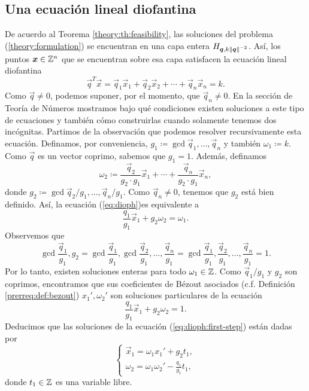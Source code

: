 \subsection{Una ecuación lineal diofantina}
\noindent
De acuerdo al Teorema \ref{theory:th:feasibility}, las soluciones del problema
(\ref{theory:formulation}) se encuentran en una capa entera $H_{\boldsymbol{q}, k\left\lVert \boldsymbol{q} \right\rVert^{-2}}$.
Así, los puntos $\boldsymbol{x} \in \mathbb{Z}^n$ que se encuentran sobre esa capa satisfacen la ecuación lineal
diofantina
\begin{equation}
	\label{eq:dioph}
	\vec{q}^T\vec{x} = \vec{q}_1\vec{x}_1 + \vec{q}_2\vec{x}_2 + \cdots + \vec{q}_n\vec{x}_n = k.
\end{equation}
Como $\vec{q} \neq 0$, podemos suponer, por el momento, que $\vec{q}_n \neq 0$. En la sección de
Teoría de Números mostramos bajo qué condiciones existen soluciones a este tipo de ecuaciones y
también cómo construirlas cuando solamente tenemos dos incógnitas. Partimos de la observación que
podemos resolver recursivamente esta ecuación. Definamos, por conveniencia, $g_1 \coloneq
\gcd{\vec{q}_1, \ldots, \vec{q}_n}$ y también $\omega_1 \coloneq k$. Como $\vec{q}$ es un vector
coprimo, sabemos que $g_1 = 1$. Además, definamos
\begin{equation*}
	\omega_2 \coloneq \frac{\vec{q}_2}{g_2 \cdot g_1}\vec{x}_1 + \cdots + \frac{\vec{q}_n}{g_2 \cdot
	g_1}\vec{x}_n,
\end{equation*}
donde $g_2 \coloneq \gcd{\vec{q}_2/g_1, \ldots, \vec{q}_n/g_1}$. Como $\vec{q}_n \neq 0$, tenemos
que $g_2$ está bien definido. Así, la ecuación (\ref{eq:dioph})es equivalente a
\begin{equation}
	\label{eq:dioph:first-step}
	\frac{q_1}{g_1}\vec{x}_1 + g_2\omega_2 = \omega_1.
\end{equation}
Observemos que
\begin{equation*}
	\gcd{\frac{\vec{q}_1}{g_1}, g_2}
	= \gcd{\frac{\vec{q}_1}{g_1}, \gcd{\frac{\vec{q}_2}{g_1}, \ldots, \frac{\vec{q}_n}{g_1}}}
	= \gcd{\frac{\vec{q}_1}{g_1}, \frac{\vec{q}_2}{g_1}, \ldots, \frac{\vec{q}_n}{g_1}} = 1.
\end{equation*}
Por lo tanto, existen soluciones enteras para todo $\omega_1 \in \mathbb{Z}$. Como $\vec{q}_1/g_1$ y $g_2$
son coprimos, encontramos que sus coeficientes de Bézout asociados (c.f. Definición
\ref{prerreq:def:bezout}) $x_1', \omega_2'$ son soluciones particulares de la ecuación
\begin{equation*}
	\frac{q_1}{g_1}\vec{x}_1 + g_2\omega_2 = 1.
\end{equation*}
Deducimos que las soluciones de la ecuación (\ref{eq:dioph:first-step}) están dadas por
\begin{equation*}
	\begin{cases}
		\vec{x}_1 = \omega_1x_1' + g_2t_1, \\
		\omega_2 = \omega_1\omega_2' - \frac{q_1}{g_1}t_1,
	\end{cases}
\end{equation*}
donde $t_1 \in \mathbb{Z}$ es una variable libre.


